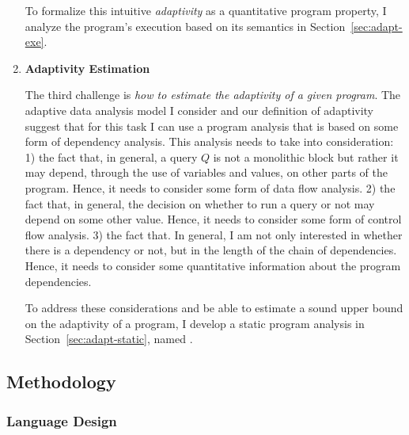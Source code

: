 \begin{enumerate}
To formalize this intuitive \emph{adaptivity} as a quantitative program property, 
I analyze the program's execution based on its semantics
in Section~\ref{sec:adapt-exe}.
\item 
\textbf{Adaptivity Estimation}

The third challenge is \emph{how to estimate the adaptivity of a given program}. 
The adaptive data analysis model I consider and our definition of adaptivity suggest that for this task 
I can use a program analysis that is based on some form of dependency analysis.
 This analysis needs to take into consideration:
1) the fact that, in general, a query $Q$ is not a monolithic block but rather it may depend, through the use of variables and values, on other parts of the program. 
Hence, it needs to consider some form of data flow analysis. 
2) the fact that, in general, the decision on whether to run a query or not may depend on some other value. Hence, 
 it needs to consider some form of control flow analysis.
3) the fact that. In general, I am not only interested in whether there is a dependency or not, but in the length of the chain of dependencies. 
Hence, it needs to consider some quantitative information about the program dependencies. %

To address these considerations and be able to estimate a sound upper bound on the adaptivity of a program, 
I develop a static program analysis in Section~\ref{sec:adapt-static}, named {\THESYSTEM}.
\end{enumerate}
%
\subsection{Methodology}
\label{sec:adapt-intro-overview}

\subsubsection{Language Design}
